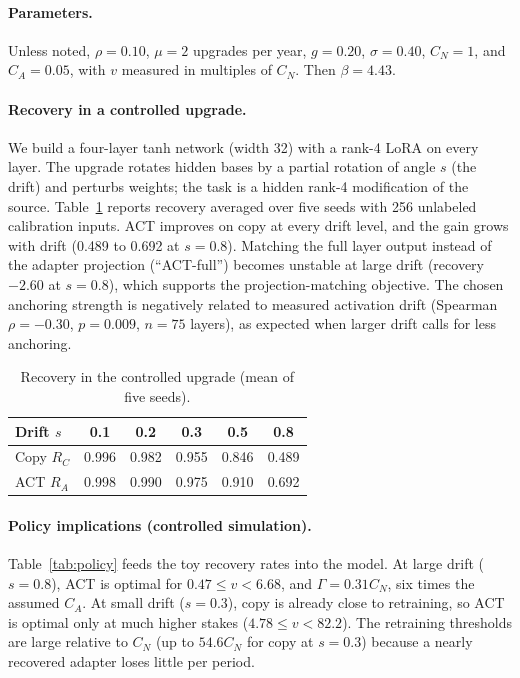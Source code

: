 \documentclass[preprint,12pt,authoryear]{elsarticle}
\begin{document}
\paragraph{Parameters.} Unless noted, $\rho=0.10$, $\mu=2$ upgrades per year, $g=0.20$, $\sigma=0.40$, $C_N=1$, and
$C_A=0.05$, with $v$ measured in multiples of $C_N$. Then $\beta=4.43$.

\paragraph{Recovery in a controlled upgrade.} We build a four-layer tanh network (width 32) with a rank-4 LoRA on
every layer. The upgrade rotates hidden bases by a partial rotation of angle $s$ (the drift) and perturbs weights; the
task is a hidden rank-4 modification of the source. Table~\ref{tab:toy} reports recovery averaged over five seeds
with 256 unlabeled calibration inputs. ACT improves on copy at every drift level, and the gain grows with drift
(0.489 to 0.692 at $s=0.8$). Matching the full layer output instead of the adapter projection (``ACT-full'') becomes
unstable at large drift (recovery $-2.60$ at $s=0.8$), which supports the projection-matching objective. The chosen
anchoring strength is negatively related to measured activation drift (Spearman $\rho=-0.30$, $p=0.009$,
$n=75$ layers), as expected when larger drift calls for less anchoring.

\begin{table}[t]
\centering
\caption{Recovery in the controlled upgrade (mean of five seeds).}\label{tab:toy}
\begin{tabular}{lccccc}
\toprule
Drift $s$ & 0.1 & 0.2 & 0.3 & 0.5 & 0.8\\
\midrule
Copy $R_C$ & 0.996 & 0.982 & 0.955 & 0.846 & 0.489\\
ACT $R_A$ & 0.998 & 0.990 & 0.975 & 0.910 & 0.692\\
\bottomrule
\end{tabular}
\end{table}

\paragraph{Policy implications (controlled simulation).} Table~\ref{tab:policy} feeds the toy recovery rates into the model. At large drift
($s=0.8$), ACT is optimal for $0.47\le v<6.68$, and $\Gamma=0.31C_N$, six times the assumed $C_A$. At small drift
($s=0.3$), copy is already close to retraining, so ACT is optimal only at much higher stakes ($4.78\le v<82.2$).
The retraining thresholds are large relative to $C_N$ (up to $54.6C_N$ for copy at $s=0.3$) because a nearly
recovered adapter loses little per period.
\end{document}
